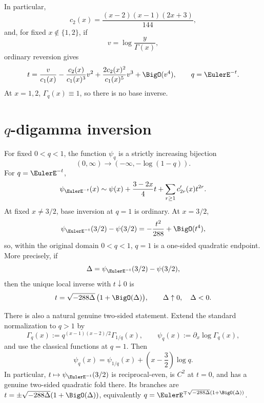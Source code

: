 In particular,
\[
  c_2(x)=\frac{(x-2)(x-1)(2x+3)}{144},
\]
and, for fixed \(x\notin\{1,2\}\), if
\[
  v=\log\frac{y}{\Gamma(x)},
\]
ordinary reversion gives
\[
  t=\frac{v}{c_1(x)}
   -\frac{c_2(x)}{c_1(x)^3}v^2
   +\frac{2c_2(x)^2}{c_1(x)^5}v^3+\BigO(v^4),
  \qquad q=\EulerE^{-t}.
\]
At \(x=1,2\), \(\Gamma_q(x)\equiv1\), so there is no base inverse.

\section{\texorpdfstring{\(q\)-digamma inversion}{q-digamma inversion}}
\label{sec:qs-qdigamma}

\begin{proposition}
\label{prop:qs-qdigamma-inverse}
For fixed \(0<q<1\), the function \(\psi_q\) is a strictly increasing
bijection
\[
  (0,\infty)\longrightarrow(-\infty,-\log(1-q)).
\]
For \(q=\EulerE^{-t}\),
\[
  \psi_{\EulerE^{-t}}(x)
  \sim\psi(x)+\frac{3-2x}{4}t
  +\sum_{r\ge1}c_{2r}'(x)t^{2r}.
\]
At fixed \(x\ne3/2\), base inversion at \(q=1\) is ordinary.  At \(x=3/2\),
\[
  \psi_{\EulerE^{-t}}(3/2)-\psi(3/2)
  =-\frac{t^2}{288}+\BigO(t^4),
\]
so, within the original domain \(0<q<1\), \(q=1\) is a one-sided quadratic
endpoint.  More precisely, if
\[
 \Delta=\psi_{\EulerE^{-t}}(3/2)-\psi(3/2),
\]
then the unique local inverse with \(t\downarrow0\) is
\[
 t=\sqrt{-288\Delta}\,\bigl(1+\BigO(\Delta)\bigr),
 \qquad \Delta\uparrow0,\quad \Delta<0.
\]

There is also a natural genuine two-sided statement.  Extend the standard
normalization to \(q>1\) by
\[
 \Gamma_q(x):=q^{(x-1)(x-2)/2}\Gamma_{1/q}(x),
 \qquad \psi_q(x):=\partial_x\log\Gamma_q(x),
\]
and use the classical functions at \(q=1\).  Then
\[
 \psi_q(x)=\psi_{1/q}(x)+\left(x-\frac32\right)\log q.
\]
In particular, \(t\mapsto\psi_{\EulerE^{-t}}(3/2)\) is reciprocal-even,
is \(C^2\) at \(t=0\), and has a genuine two-sided quadratic fold there.
Its branches are \(t=\pm\sqrt{-288\Delta}(1+\BigO(\Delta))\), equivalently
\(q=\EulerE^{\mp\sqrt{-288\Delta}(1+\BigO(\Delta))}\).
\end{proposition}

